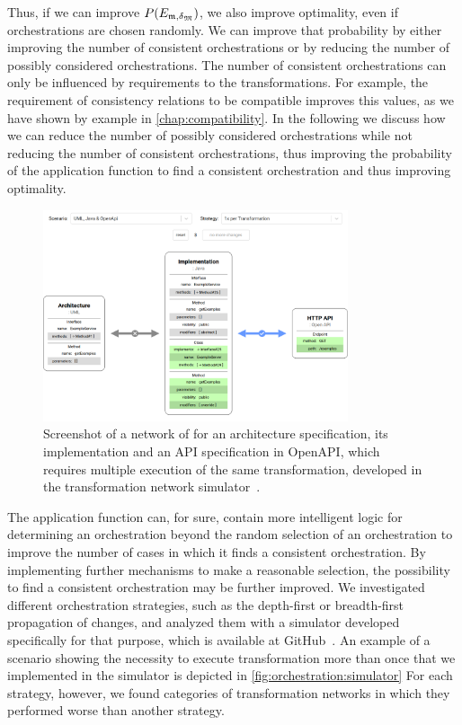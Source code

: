 Thus, if we can improve $P(E_{\mathfrak{m},\mathfrak{\delta}_{\mathfrak{M}}})$, we also improve optimality, even if orchestrations are chosen randomly.
We can improve that probability by either improving the number of consistent orchestrations or by reducing the number of possibly considered orchestrations.
The number of consistent orchestrations can only be influenced by requirements to the transformations.
For example, the requirement of consistency relations to be compatible improves this values, as we have shown by example in \autoref{chap:compatibility}.
In the following we discuss how we can reduce the number of possibly considered orchestrations while not reducing the number of consistent orchestrations, thus improving the probability of the application function to find a consistent orchestration and thus improving optimality.

\begin{figure}
    \centering
    \includegraphics[width=0.8\textwidth]{figures/correctness/orchestration/simulator_screenshot.png}
    \caption{Screenshot of a network of for an architecture specification, its implementation and an API specification in OpenAPI, which requires multiple execution of the same transformation, developed in the transformation network simulator~\cite{orchestrationSimulator}.}
    \label{fig:orchestration:simulator}
\end{figure}

The application function can, for sure, contain more intelligent logic for determining an orchestration beyond the random selection of an orchestration to improve the number of cases in which it finds a consistent orchestration.
By implementing further mechanisms to make a reasonable selection, the possibility to find a consistent orchestration may be further improved.
We investigated different orchestration strategies, such as the depth-first or breadth-first propagation of changes, and analyzed them with a simulator developed specifically for that purpose, which is available at GitHub~\cite{orchestrationSimulator}.
An example of a scenario showing the necessity to execute transformation more than once that we implemented in the simulator is depicted in \autoref{fig:orchestration:simulator}
For each strategy, however, we found categories of transformation networks in which they performed worse than another strategy.

